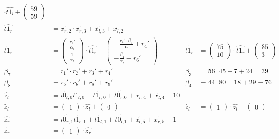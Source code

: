 \begin{align*}
\cdot \widehat{t1_l} +
\begin{pmatrix}59\\59\end{pmatrix}\\
%
\widehat{t1_r} &=
\widetilde{x_{r,2}} \cdot \widetilde{x_{r,3}} + \widetilde{x_{l,3}} +
\widetilde{x_{l,2}} \\
%
\widetilde{t1_r} &=
\begin{pmatrix}
  \frac{r_1'}{\alpha_r}\\
  \frac{1}{\alpha_r}
\end{pmatrix}
\cdot \widehat{t1_r} +
\begin{pmatrix}
  -\frac{r_1' \cdot \beta_6}{\alpha_r} + r_4'\\
  -\frac{\beta_4}{\alpha_r}-r_6'
\end{pmatrix}
&
\widetilde{t1_r} &=
\begin{pmatrix}75\\10\end{pmatrix}
\cdot \widehat{t1_r} +
\begin{pmatrix}85\\3\end{pmatrix}\\
%
\beta_7 &= r_1' \cdot r_2' + r_3' + r_4'
&
 \beta_3 &= 56 \cdot 45 + 7 + 24 = 29\\
%
\beta_8 &= r_5' \cdot r_6' + r_8' + r_8'
&
\beta_4 &= 44 \cdot 80 + 18 + 29 = 76\\
%
\widehat{z_l} &=
\widetilde{t0_{l,0}}\widetilde{t1_{l,0}} +
\widetilde{t1_{r,0}} + \widetilde{t0_{r,0}} + \widetilde{x_{r,4}} +
\widetilde{x_{l,4}} + 10\\
%
\widetilde{z_l} &=
\begin{pmatrix}1\end{pmatrix}
\cdot \widehat{z_l} +
\begin{pmatrix}0\end{pmatrix}
&
\widetilde{z_l} &=
\begin{pmatrix}1\end{pmatrix}
\cdot \widehat{z_l} +
\begin{pmatrix}0\end{pmatrix}\\
%
\widehat{z_r} &=
\widetilde{t0_{r,1}}\widetilde{t1_{r,1}} +
\widetilde{t1_{l,1}} + \widetilde{t0_{l,1}} + \widetilde{x_{l,5}} +
\widetilde{x_{r,5}} + 1\\
%
\widetilde{z_r} &=
\begin{pmatrix}1\end{pmatrix}
\cdot \widehat{z_r} +

\end{align*}
